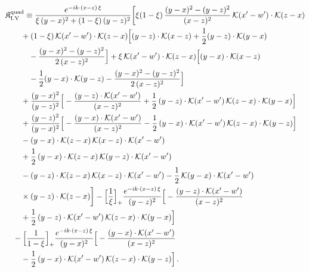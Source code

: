\begin{align}\label{eq:K-rm_quad_rm_I_V}
&\mathfrak{K}^{\rm quad}_{\rm I.V}\equiv \frac{e^{-ik\cdot(x-z)\,\xi}}{\xi\,(y-x)^{2}+(1-\xi)\,(y-z)^{2}}\bigg[\xi(1-\xi)\, \frac{(y-x)^{2}-(y-z)^{2}}{(x-z)^{2}}\, \mathcal{K}(x'-w')\cdot\mathcal{K}(z-x)\notag\\
&\quad\quad +(1-\xi)\, \mathcal{K}(x'-w')\cdot\mathcal{K}(z-x)\Big[(y-z)\cdot\mathcal{K}(x-z) +\frac{1}{2}(y-z)\cdot\mathcal{K}(y-x)\notag\\
&\quad\quad\quad -\frac{(y-x)^{2}-(y-z)^{2}}{2\,(x-z)^{2}}\Big] +\xi\, \mathcal{K}(x'-w')\cdot\mathcal{K}(z-x)\Big[(y-x)\cdot\mathcal{K}(x-z)\notag\\
&\quad\quad\quad -\frac{1}{2}(y-x)\cdot\mathcal{K}(y-z) -\frac{(y-x)^{2}-(y-z)^{2}}{2\,(x-z)^{2}}\Big]\notag\\
&\quad\quad +\frac{(y-x)^{2}}{(y-z)^{2}}\Big[-\frac{(y-z)\cdot\mathcal{K}(x'-w')}{(x-z)^{2}} +\frac{1}{2}\, (y-z)\cdot\mathcal{K}(x'-w')\, \mathcal{K}(z-x)\cdot\mathcal{K}(y-x)\Big]\notag\\
&\quad\quad +\frac{(y-z)^{2}}{(y-x)^{2}}\Big[-\frac{(y-x)\cdot\mathcal{K}(x'-w')}{(x-z)^{2}} -\frac{1}{2}\, (y-x)\cdot\mathcal{K}(x'-w')\, \mathcal{K}(z-x)\cdot\mathcal{K}(y-z)\Big]\notag\\
&\quad\quad -(y-x)\cdot\mathcal{K}(z-x)\, \mathcal{K}(x-z)\cdot\mathcal{K}(x'-w')\notag\\
&\quad\quad +\frac{1}{2}\, (y-x)\cdot\mathcal{K}(z-x)\, \mathcal{K}(y-z)\cdot\mathcal{K}(x'-w')\notag\\
&\quad\quad -(y-z)\cdot\mathcal{K}(z-x)\, \mathcal{K}(x-z)\cdot\mathcal{K}(x'-w') -\frac{1}{2}\, \mathcal{K}(y-x)\cdot\mathcal{K}(x'-w')\notag\\
&\quad\quad \times (y-z)\cdot\mathcal{K}(z-x)\bigg] -\Big[\frac{1}{\xi}\Big]_{+}\frac{e^{-ik\cdot(x-z)\,\xi}}{(y-z)^{2}}\Big[-\frac{(y-z)\cdot\mathcal{K}(x'-w')}{(x-z)^{2}}\notag\\
&\quad\quad +\frac{1}{2}\, (y-z)\cdot\mathcal{K}(x'-w')\, \mathcal{K}(z-x)\cdot\mathcal{K}(y-x)\Big]\notag\\
&\quad -\Big[\frac{1}{1-\xi}\Big]_{+}\frac{e^{-ik\cdot(x-z)\,\xi}}{(y-x)^{2}}\Big[-\frac{(y-x)\cdot\mathcal{K}(x'-w')}{(x-z)^{2}}\notag\\
&\quad\quad -\frac{1}{2}\, (y-x)\cdot\mathcal{K}(x'-w')\, \mathcal{K}(z-x)\cdot\mathcal{K}(y-z)\Big]\,.
\end{align}
